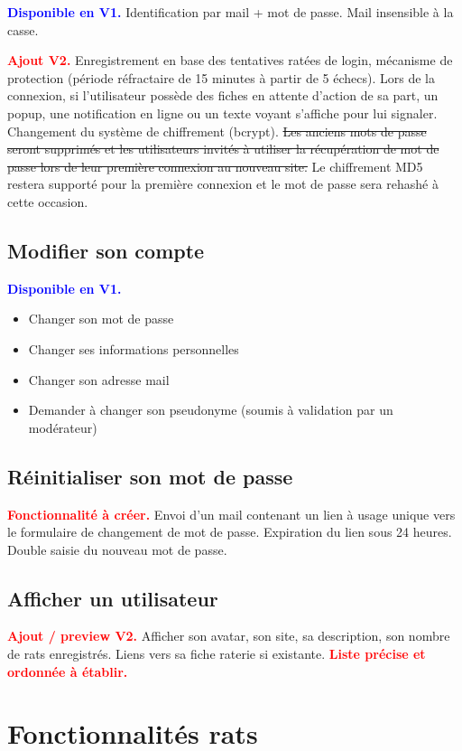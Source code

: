 \documentclass[a4paper,10pt]{article}
\newcommand\existant[1]{\noindent\textbf{\textcolor{blue}{#1}}}
\newcommand\desire[1]{\noindent\textbf{\textcolor{red}{#1}}}
\begin{document}
\existant{Disponible en V1.} Identification par mail + mot de passe. Mail insensible à la casse.

\desire{Ajout V2.} Enregistrement en base des tentatives ratées de login, mécanisme de protection (période réfractaire de 15 minutes à partir de 5 échecs). Lors de la connexion, si l'utilisateur possède des fiches en attente d'action de sa part, un popup, une notification en ligne ou un texte voyant s'affiche pour lui signaler. Changement du système de chiffrement (bcrypt). \sout{Les anciens mots de passe seront supprimés et les utilisateurs invités à utiliser la récupération de mot de passe lors de leur première connexion au nouveau site.} Le chiffrement MD5 restera supporté pour la première connexion et le mot de passe sera rehashé à cette occasion.

\subsection{Modifier son compte}

\existant{Disponible en V1.}
\begin{itemize}
\item Changer son mot de passe
\item Changer ses informations personnelles 
\item Changer son adresse mail
\item Demander à changer son pseudonyme (soumis à validation par un modérateur)
\end{itemize}

\subsection{Réinitialiser son mot de passe}
\desire{Fonctionnalité à créer.} Envoi d'un mail contenant un lien à usage unique vers le formulaire de changement de mot de passe. Expiration du lien sous 24 heures. Double saisie du nouveau mot de passe.

\subsection{Afficher un utilisateur}

\desire{Ajout / preview V2.} Afficher son avatar, son site, sa description, son nombre de rats enregistrés. Liens vers sa fiche raterie si existante. \desire{Liste précise et ordonnée à établir.}

\section{Fonctionnalités rats}
\end{document}
